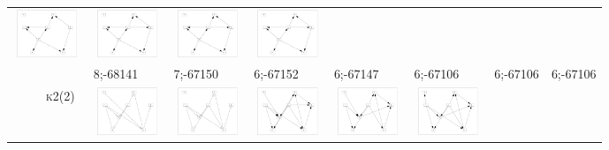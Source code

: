 \begin{table}[!p]
\begin{tabular}{r@{}p{2.0cm}@{}p{2.0cm}@{}p{2.0cm}@{}p{2.0cm}@{}p{2.0cm}@{}p{2.0cm}@{}p{2.0cm}}
\includegraphics[width=20.3mm, height=14.25mm]{fig/11-Mar-2003-18-40-53-dag-asia2000-K2-RES} &
\includegraphics[width=20.3mm, height=14.25mm]{fig/11-Mar-2003-18-40-53-dag-asia5000-K2-RES} &
\includegraphics[width=20.3mm, height=14.25mm]{fig/11-Mar-2003-18-40-53-dag-asia10000-K2-RES} &
\includegraphics[width=20.3mm, height=14.25mm]{fig/11-Mar-2003-18-40-53-dag-asia15000-K2-RES} \\
& 8;-68141 & 7;-67150 & 6;-67152 & 6;-67147 & 6;-67106 & 6;-67106 & 6;-67106\\
\textsc{k2(2)~} &
\includegraphics[width=20.3mm, height=14.25mm]{fig/11-Sep-2003-14-47-35-dag-asia250-K2-RES} &
\includegraphics[width=20.3mm, height=14.25mm]{fig/11-Aug-2003-14-59-43-dag-asia500-K2-RES} &
\includegraphics[width=20.3mm, height=14.25mm]{fig/11-Mar-2003-18-46-18-dag-asia1000-K2-RES} &
\includegraphics[width=20.3mm, height=14.25mm]{fig/11-Mar-2003-18-46-18-dag-asia2000-K2-RES} &
\includegraphics[width=20.3mm, height=14.25mm]{fig/11-Mar-2003-18-46-18-dag-asia5000-K2-RES} &

\end{tabular}
\end{table}
